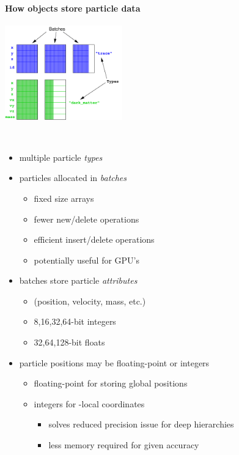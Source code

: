 \begin{frame}[fragile,label=ss-recent-particles] 
  \secframetitle{\ssRecentParticles}
\framesubtitle{How  objects store particle data}
\begin{minipage}{1.8in}
\includegraphics[width=2.0in]{particles-design.pdf} \ \\
\end{minipage} \ 
\begin{minipage}{2.5in}
\begin{itemize}
\item multiple particle \textit{types}
\item particles allocated in \textit{batches}
\begin{itemize}
\item fixed size arrays
\item fewer new/delete operations
\item efficient insert/delete operations
\item potentially useful for GPU's
\end{itemize}
\item batches store particle \textit{attributes}
\begin{itemize}
\item (position, velocity, mass, etc.)
\item 8,16,32,64-bit integers
\item 32,64,128-bit floats
\end{itemize}
\end{itemize}
\end{minipage}
\begin{itemize}
\item particle positions may be floating-point or integers
\begin{itemize}
\item floating-point for storing global positions
\item integers for -local coordinates
\begin{itemize}
\item solves reduced precision issue for deep hierarchies
\item less memory required for given accuracy
\end{itemize}
\end{itemize}
\end{itemize}
\end{frame}

